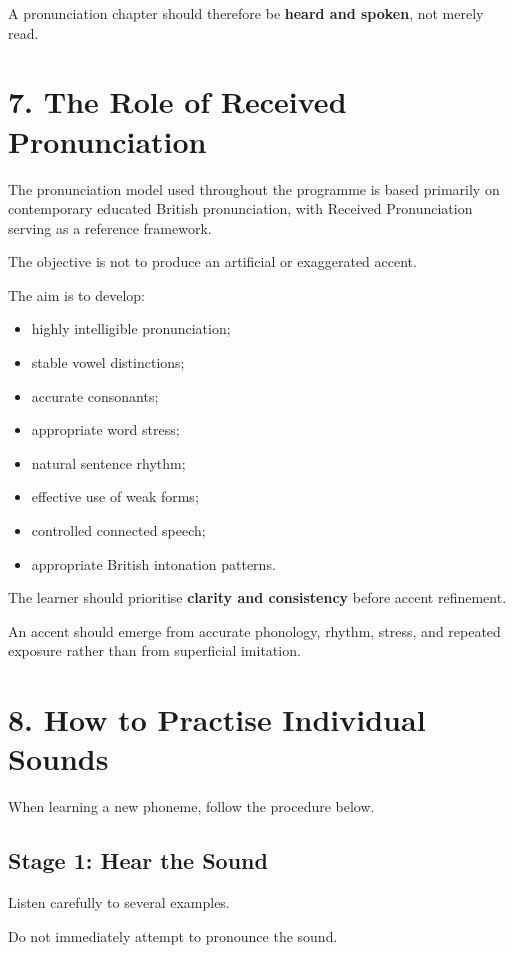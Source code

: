 A pronunciation chapter should therefore be \textbf{heard and spoken}, not merely read.

\section*{7. The Role of Received Pronunciation}

The pronunciation model used throughout the programme is based primarily on contemporary educated British pronunciation, with Received Pronunciation serving as a reference framework.

The objective is not to produce an artificial or exaggerated accent.

The aim is to develop:

\begin{itemize}
    \item highly intelligible pronunciation;
    \item stable vowel distinctions;
    \item accurate consonants;
    \item appropriate word stress;
    \item natural sentence rhythm;
    \item effective use of weak forms;
    \item controlled connected speech;
    \item appropriate British intonation patterns.
\end{itemize}

The learner should prioritise \textbf{clarity and consistency} before accent refinement.

An accent should emerge from accurate phonology, rhythm, stress, and repeated exposure rather than from superficial imitation.

\section*{8. How to Practise Individual Sounds}

When learning a new phoneme, follow the procedure below.

\subsection*{Stage 1: Hear the Sound}

Listen carefully to several examples.

Do not immediately attempt to pronounce the sound.

